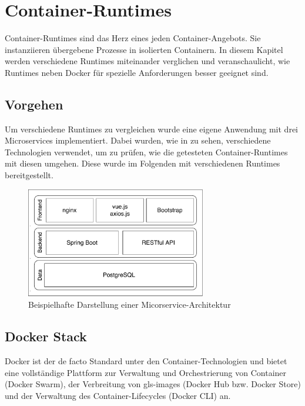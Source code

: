 \chapter{Container-Runtimes}
\label{chap:compCtnrRuntimes}

Container-Runtimes sind das Herz eines jeden Container-Angebots. Sie instanziieren übergebene Prozesse in isolierten Containern. In diesem Kapitel werden verschiedene Runtimes miteinander verglichen und veranschaulicht, wie Runtimes neben Docker für spezielle Anforderungen besser geeignet sind.

\section{Vorgehen}
\label{sec:vorgehen}
Um verschiedene Runtimes zu vergleichen wurde eine eigene Anwendung mit drei Microservices implementiert. Dabei wurden, wie in  zu sehen, verschiedene Technologien verwendet, um zu prüfen, wie die getesteten Container-Runtimes mit diesen umgehen. Diese wurde im Folgenden mit verschiedenen Runtimes bereitgestellt.

\begin{figure}[h]
	\begin{center}
		\includegraphics[width=0.7\textwidth]{bilder/microservice-example-stack.pdf}
		\caption{Beispielhafte Darstellung einer Micorservice-Architektur}
		\label{fig:todosStack}
	\end{center}
\end{figure}

\section{Docker Stack}
\label{sec:compDocker}
Docker ist der de facto Standard unter den Container-Technologien und bietet eine vollständige Plattform zur Verwaltung und Orchestrierung von Container (Docker Swarm), der Verbreitung von \glspl{gls-image} (Docker Hub bzw. Docker Store) und der Verwaltung des Container-Lifecycles (Docker CLI) an.

